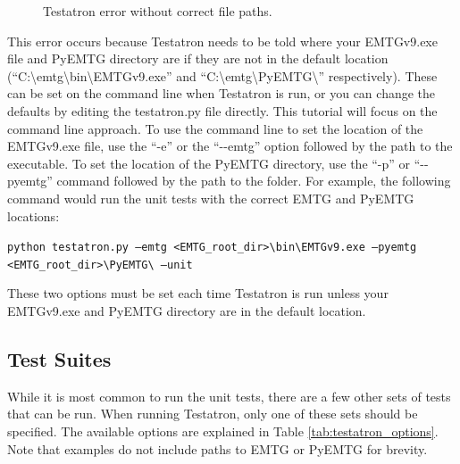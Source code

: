 \documentclass[11pt]{article}
\begin{document}
\begin{figure}[H]
	\centering
	\caption{\label{fig:testatron_error}Testatron error without correct file paths.}
\end{figure}

\noindent This error occurs because Testatron needs to be told where your EMTGv9.exe file and PyEMTG directory are if they are not in the default location (``C:\textbackslash emtg\textbackslash bin\textbackslash EMTGv9.exe'' and ``C:\textbackslash emtg\textbackslash PyEMTG\textbackslash{}'' respectively). These can be set on the command line when Testatron is run, or you can change the defaults by editing the testatron.py file directly. This tutorial will focus on the command line approach. To use the command line to set the location of the EMTGv9.exe file, use the ``-e'' or the ``-{}-emtg'' option followed by the path to the executable. To set the location of the PyEMTG directory, use the ``-p'' or ``-{}-pyemtg'' command followed by the path to the folder. For example, the following command would run the unit tests with the correct \ac{EMTG} and PyEMTG locations:

\texttt{python testatron.py --emtg <EMTG\_root\_dir>\textbackslash bin\textbackslash EMTGv9.exe --pyemtg <EMTG\_root\_di\newline\indent r>\textbackslash PyEMTG\textbackslash{} --unit}

\noindent These two options must be set each time Testatron is run unless your EMTGv9.exe and PyEMTG directory are in the default location.

\subsection{Test Suites}
\label{sec:test_suites}

While it is most common to run the unit tests, there are a few other sets of tests that can be run. When running Testatron, only one of these sets should be specified. The available options are explained in Table \ref{tab:testatron_options}. Note that examples do not include paths to \ac{EMTG} or PyEMTG for brevity.
\end{document}
